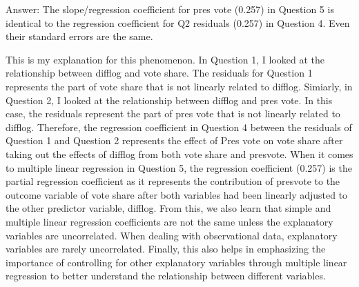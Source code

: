 \documentclass{article}
\begin{document}
Answer: \linebreak
The slope/regression coefficient for pres vote (0.257) in Question 5 is identical to the regression coefficient for Q2 residuals (0.257) in Question 4. Even their standard errors are the same.

This is my explanation for this phenomenon.
In Question 1, I looked at the relationship between difflog and vote share. The residuals for Question 1 represents the part of vote share that is not linearly related to difflog.
Simiarly, in Question 2, I looked at the relationship between difflog and pres vote. In this case, the residuals represent the part of pres vote that is not linearly related to difflog. 
Therefore, the regression coefficient in Question 4 between the residuals of Question 1 and Question 2 represents the effect of Pres vote on vote share after taking out the effects of difflog from both vote share and presvote. 
When it comes to multiple linear regression in Question 5, the regression coefficient (0.257) is the partial regression coefficient as it represents the contribution of presvote to the outcome variable of vote share after both variables had been linearly adjusted to the other predictor variable, difflog.
From this, we also learn that simple and multiple linear regression coefficients are not the same unless the explanatory variables are uncorrelated. When dealing with observational data, explanatory variables are rarely uncorrelated. Finally, this also helps in emphasizing the importance of controlling for other explanatory variables through multiple linear regression to better understand the relationship between different variables.
\end{document}
